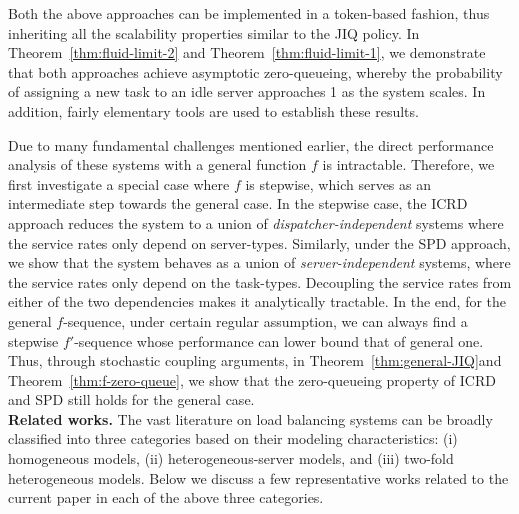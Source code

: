 \documentclass[11pt, reqno]{article}
\numberwithin{equation}{section}
\numberwithin{theorem}{section}
\begin{document}
Both the above approaches can be implemented in a token-based fashion, thus inheriting all the scalability properties similar to the JIQ policy.
In Theorem~\ref{thm:fluid-limit-2} and Theorem~\ref{thm:fluid-limit-1}, we demonstrate that both approaches achieve asymptotic zero-queueing, whereby the probability of assigning a new task to an idle server approaches 1 as the system scales.
In addition, fairly elementary tools are used to establish these results.

Due to many fundamental challenges mentioned earlier, the direct performance analysis of these systems with a general function $f$ is intractable. 
Therefore, we first investigate a special case where $f$ is stepwise, which serves as an intermediate step towards the general case. 
In the stepwise case, the ICRD approach reduces the system to a union of \textit{dispatcher-independent} systems where the service rates only depend on server-types.
Similarly, under the SPD approach, we show that the system behaves as a union of \textit{server-independent} systems, where the service rates only depend on the task-types.
Decoupling the service rates from either of the two dependencies makes it analytically tractable.
In the end, for the general $f$-sequence, under certain regular assumption, we can always find a stepwise $f'$-sequence whose performance can lower bound that of general one. 
Thus, through stochastic coupling arguments, in Theorem~\ref{thm:general-JIQ}and Theorem~\ref{thm:f-zero-queue}, we show that the zero-queueing property of ICRD and SPD still holds for the general case.\\


\noindent
\textbf{Related works.}
The vast literature on load balancing systems can be broadly classified into three categories based on their modeling characteristics: (i) homogeneous models, (ii) heterogeneous-server models, and (iii) two-fold heterogeneous models. 
Below we discuss a few representative works related to the current paper in each of the above three categories.
\end{document}
